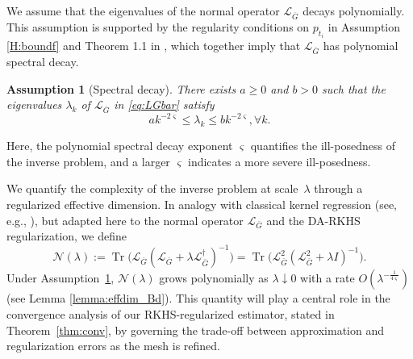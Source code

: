 \documentclass[12pt]{article}
\def\LGbar{ {\mathcal{L}_{\overline{G}}}  }
\numberwithin{equation}{section}
\numberwithin{theorem}{section}
\newtheorem{assumption}{Assumption}
\begin{document}
We assume that the eigenvalues of the normal operator $\LGbar$ decays polynomially. This assumption is supported by the regularity conditions on $p_{t_i}$ in Assumption \ref{H:boundf} and Theorem 1.1 in \cite{volkov2024optimal}, which together imply that $\LGbar$ has polynomial spectral decay.  
\begin{assumption}[Spectral decay]
\label{H:spectral_decay}
There exists $a\geq 0$ and $b>0$ such that the eigenvalues $\lambda_k$ of $\LGbar$ in \eqref{eq:LGbar} satisfy 
\[
ak^{-2\varsigma} \leq \lambda_k \leq b k^{-2\varsigma}, \forall k.  
\] 
\end{assumption}
Here, the polynomial spectral decay exponent $\varsigma$ quantifies the ill-posedness of the inverse problem, and a larger $\varsigma$ indicates a more severe ill-posedness. 


We quantify the complexity of the inverse problem at scale~$\lambda$ through a regularized effective dimension. In analogy with classical kernel regression (see, e.g., \cite{caponnetto2007optimal,zhang2005learning}), but adapted here to the normal operator $\mathcal{L}_{\bar{G}}$ and the DA-RKHS regularization, we define
\begin{equation}\label{eq:defNeff}
\mathcal{N}(\lambda)
:= \operatorname{Tr}\bigl(\mathcal{L}_{\bar{G}}(\mathcal{L}_{\bar{G}}+\lambda \mathcal{L}_{\bar{G}}^{\dagger})^{-1}\bigr)
= \operatorname{Tr}\bigl(\mathcal{L}_{\bar{G}}^2(\mathcal{L}_{\bar{G}}^2+\lambda I)^{-1}\bigr).
\end{equation}
Under Assumption~\ref{H:spectral_decay}, $\mathcal{N}(\lambda)$ grows polynomially as $\lambda \downarrow 0$ with a rate $O(\lambda^{-\frac{1}{4\varsigma}})$  (see Lemma \ref{lemma:effdim_Bd}). This quantity will play a central role in the convergence analysis of our RKHS-regularized estimator, stated in Theorem~\ref{thm:conv}, by governing the trade-off between approximation and regularization errors as the mesh is refined. 
\end{document}
